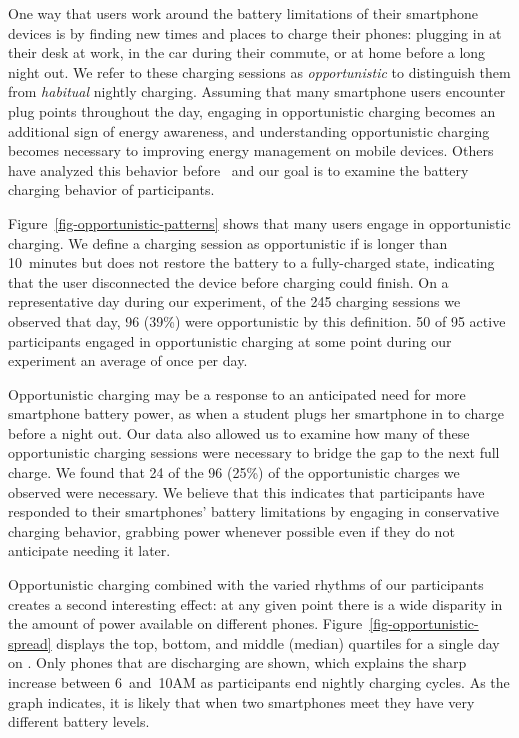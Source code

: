 One way that users work around the battery limitations of their smartphone
devices is by finding new times and places to charge their phones: plugging
in at their desk at work, in the car during their commute, or at home before
a long night out. We refer to these charging sessions as
\textit{opportunistic} to distinguish them from \textit{habitual} nightly
charging. Assuming that many smartphone users encounter plug points
throughout the day, engaging in opportunistic charging becomes an additional
sign of energy awareness, and understanding opportunistic charging becomes
necessary to improving energy management on mobile devices. Others have analyzed
this behavior before~\cite{banerjee:ubicomp:2007, rahmati:mobilehci:2007} and
our goal is to examine the battery charging behavior of \PhoneLab{} participants.

Figure~\ref{fig-opportunistic-patterns} shows that many users engage in
opportunistic charging. We define a charging session as opportunistic if is
longer than 10~minutes but does not restore the battery to a fully-charged
state, indicating that the user disconnected the device before charging could
finish. On a representative day during our experiment, of the 245 charging
sessions we observed that day, 96 (39\%) were opportunistic by this
definition. 50 of 95 active participants engaged in opportunistic charging at
some point during our experiment an average of once per day.

Opportunistic charging may be a response to an anticipated need for more
smartphone battery power, as when a student plugs her smartphone in to charge
before a night out. Our data also allowed us to examine how many of these
opportunistic charging sessions were necessary to bridge the gap to the next
full charge. We found that 24 of the 96 (25\%) of the opportunistic charges
we observed were necessary. We believe that this indicates that participants
have responded to their smartphones' battery limitations by engaging in
conservative charging behavior, grabbing power whenever possible even if they
do not anticipate needing it later.

Opportunistic charging combined with the varied rhythms of our participants
creates a second interesting effect: at any given point there is a wide
disparity in the amount of power available on different phones.
Figure~\ref{fig-opportunistic-spread} displays the top, bottom, and middle
(median) quartiles for a single day on \PhoneLab{}. Only phones that are
discharging are shown, which explains the sharp increase between 6~and~10AM
as participants end nightly charging cycles.  As the graph indicates, it is
likely that when two smartphones meet they have very different battery
levels.

